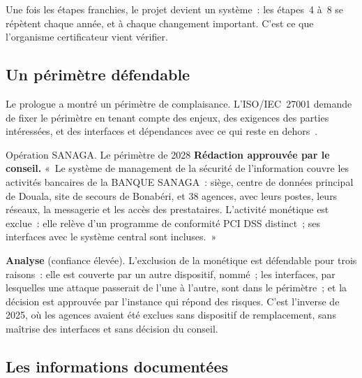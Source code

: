 Une fois les étapes franchies, le projet devient un système~: les
étapes~4 à~8 se répètent chaque année, et à chaque changement important.
C'est ce que l'organisme certificateur vient vérifier.

\subsection{Un périmètre défendable}

Le prologue a montré un périmètre de complaisance. L'ISO/IEC~27001 demande
de fixer le périmètre en tenant compte des enjeux, des exigences des
parties intéressées, et des interfaces et dépendances avec ce qui reste en
dehors~\cite{iso27001_2022}.

\begin{boxscenario}{Opération SANAGA. Le périmètre de 2028}
\textbf{Rédaction approuvée par le conseil.} «~Le système de management de
la sécurité de l'information couvre les activités bancaires de la BANQUE
SANAGA~: siège, centre de données principal de Douala, site de secours de
Bonabéri, et 38 agences, avec leurs postes, leurs réseaux, la messagerie et
les accès des prestataires. L'activité monétique est exclue~: elle relève
d'un programme de conformité PCI DSS distinct~; ses interfaces avec le
système central sont incluses.~»

\medskip
\textbf{Analyse} (confiance élevée). L'exclusion de la monétique est
défendable pour trois raisons~: elle est couverte par un autre dispositif,
nommé~; les interfaces, par lesquelles une attaque passerait de l'une à
l'autre, sont dans le périmètre~; et la décision est approuvée par
l'instance qui répond des risques. C'est l'inverse de 2025, où les agences
avaient été exclues sans dispositif de remplacement, sans maîtrise des
interfaces et sans décision du conseil.
\end{boxscenario}

\subsection{Les informations documentées}

